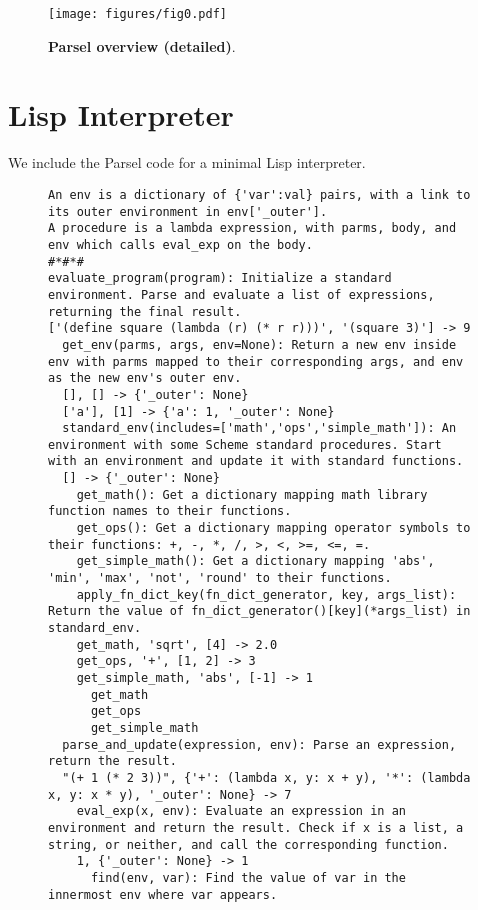 \begin{figure*}[h]
\centering
\texttt{[image: figures/fig0.pdf]}
\caption{\textbf{Parsel overview (detailed)}.}
\label{fig:detailed=overview}
\vspace{-9px}
\end{figure*}

\section{Lisp Interpreter}
\label{lisp}
We include the Parsel code for a minimal Lisp interpreter.

\begin{figure*}
\begin{lstlisting}[basicstyle=\fontsize{6}{8}\selectfont\ttfamily]
An env is a dictionary of {'var':val} pairs, with a link to its outer environment in env['_outer'].
A procedure is a lambda expression, with parms, body, and env which calls eval_exp on the body.
#*#*#
evaluate_program(program): Initialize a standard environment. Parse and evaluate a list of expressions, returning the final result.
['(define square (lambda (r) (* r r)))', '(square 3)'] -> 9
  get_env(parms, args, env=None): Return a new env inside env with parms mapped to their corresponding args, and env as the new env's outer env.
  [], [] -> {'_outer': None}
  ['a'], [1] -> {'a': 1, '_outer': None}
  standard_env(includes=['math','ops','simple_math']): An environment with some Scheme standard procedures. Start with an environment and update it with standard functions.
  [] -> {'_outer': None}
    get_math(): Get a dictionary mapping math library function names to their functions.
    get_ops(): Get a dictionary mapping operator symbols to their functions: +, -, *, /, >, <, >=, <=, =.
    get_simple_math(): Get a dictionary mapping 'abs', 'min', 'max', 'not', 'round' to their functions.
    apply_fn_dict_key(fn_dict_generator, key, args_list): Return the value of fn_dict_generator()[key](*args_list) in standard_env.
    get_math, 'sqrt', [4] -> 2.0
    get_ops, '+', [1, 2] -> 3
    get_simple_math, 'abs', [-1] -> 1
      get_math
      get_ops
      get_simple_math
  parse_and_update(expression, env): Parse an expression, return the result.
  "(+ 1 (* 2 3))", {'+': (lambda x, y: x + y), '*': (lambda x, y: x * y), '_outer': None} -> 7
    eval_exp(x, env): Evaluate an expression in an environment and return the result. Check if x is a list, a string, or neither, and call the corresponding function.
    1, {'_outer': None} -> 1
      find(env, var): Find the value of var in the innermost env where var appears.

\end{lstlisting}
\end{figure*}

